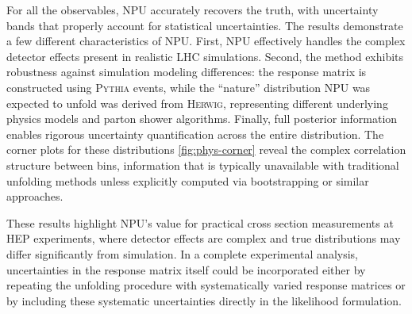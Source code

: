 {        For all the observables, NPU accurately recovers the truth, with uncertainty bands that properly account for statistical uncertainties.
        The results demonstrate a few different characteristics of NPU.
        First, NPU effectively handles the complex detector effects present in realistic LHC simulations.
        Second, the method exhibits robustness against simulation modeling differences: the response matrix is constructed using \textsc{Pythia} events, while the ``nature'' distribution NPU was expected to unfold was derived from \textsc{Herwig}, representing different underlying physics models and parton shower algorithms.
        Finally, full posterior information enables rigorous uncertainty quantification across the entire distribution.
        The corner plots for these distributions \cref{fig:phys-corner} reveal the complex correlation structure between bins, information that is typically unavailable with traditional unfolding methods unless explicitly computed via bootstrapping or similar approaches.

        These results highlight NPU's value for practical cross section measurements at HEP experiments, where detector effects are complex and true distributions may differ significantly from simulation.
        In a complete experimental analysis, uncertainties in the response matrix itself could be incorporated either by repeating the unfolding procedure with systematically varied response matrices or by including these systematic uncertainties directly in the likelihood formulation.

}
